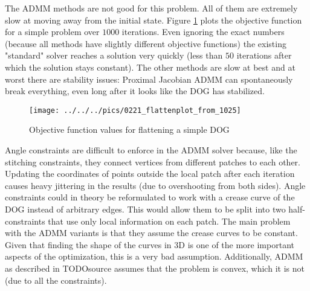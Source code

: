 \documentclass[a4paper,twoside,12pt,nochapterprefix]{scrbook}
\begin{document}
The ADMM methods are not good for this problem. All of them are extremely slow at moving away from the initial state. Figure \ref{fig:admm_results} plots the objective function for a simple problem over $1000$ iterations. Even ignoring the exact numbers (because all methods have slightly different objective functions) the existing "standard" solver reaches a solution very quickly (less than $50$ iterations after which the solution stays constant). The other methods are slow at best and at worst there are stability issues: Proximal Jacobian ADMM can spontaneously break everything, even long after it looks like the DOG has stabilized.\newline
\begin{figure}
    \centering
    \texttt{[image: ../../../pics/0221\_flattenplot\_from\_1025]}
    \caption{Objective function values for flattening a simple DOG}
    \label{fig:admm_results}
\end{figure}
Angle constraints are difficult to enforce in the ADMM solver because, like the stitching constraints, they connect vertices from different patches to each other. Updating the coordinates of points outside the local patch after each iteration causes heavy jittering in the results (due to overshooting from both sides). Angle constraints could in theory be reformulated to work with a crease curve of the DOG instead of arbitrary edges. This would allow them to be split into two half-constraints that use only local information on each patch.\newline
The main problem with the ADMM variants is that they assume the crease curves to be constant. Given that finding the shape of the curves in 3D is one of the more important aspects of the optimization, this is a very bad assumption. Additionally, ADMM as described in TODOsource assumes that the problem  is convex, which it is not (due to all the constraints).\newline

\end{document}
